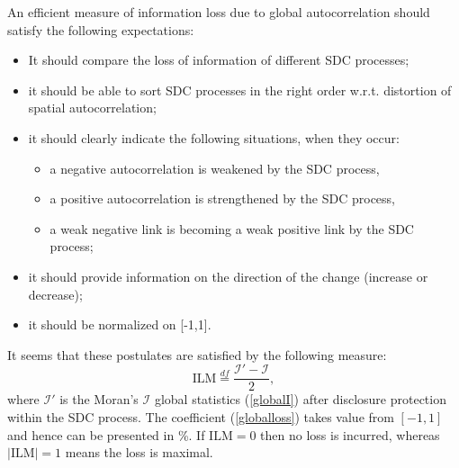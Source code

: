 An efficient measure of information loss due to global autocorrelation should satisfy the following expectations:
\begin{itemize}
    \item It should compare the loss of information of different SDC processes;
    \item it should be able to sort SDC processes in the right order w.r.t. distortion of spatial autocorrelation;
    \item it should clearly indicate the following situations, when they occur:
    \begin{itemize}
        \item a negative autocorrelation is weakened by the SDC process, 
        \item a positive autocorrelation is strengthened by the SDC process,
        \item a weak negative link is becoming a weak positive link by the SDC process;
    \end{itemize}
    \item it should provide information on the direction of the change (increase or decrease);
    \item it should be normalized on [-1,1].
\end{itemize}

It seems that these postulates are satisfied by the following measure:
\begin{equation}
\mathrm{ILM}\stackrel{df}{=}\frac{\mathcal{I}'-\mathcal{I}}{2},
\label{globalloss}
\end{equation}
where $\mathcal{I}'$ is the Moran's $\mathcal{I}$ global statistics (\ref{globalI}) after disclosure protection within the SDC process. The coefficient (\ref{globalloss}) takes value from $[-1,1]$ and hence can be presented in \%. If $\mathrm{ILM}=0$ then no loss is incurred, whereas $|\mathrm{ILM}|=1$ means the loss is maximal.%

